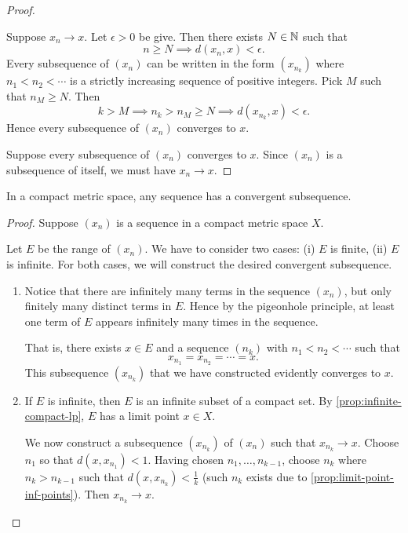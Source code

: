 \begin{proof} \

\fbox{$\implies$} Suppose $x_n\to x$. Let $\epsilon>0$ be give. Then there exists $N\in\mathbb N$ such that
\[n\ge N\implies d(x_n,x)<\epsilon.\]
Every subsequence of $(x_n)$ can be written in the form $(x_{n_k})$ where $n_1<n_2<\cdots$ is a strictly increasing sequence of positive integers. Pick $M$ such that $n_M\ge N$. Then
\[k>M\implies n_k>n_M\ge N\implies d(x_{n_k},x)<\epsilon.\]
Hence every subsequence of $(x_n)$ converges to $x$.

\fbox{$\impliedby$} Suppose every subsequence of $(x_n)$ converges to $x$. Since $(x_n)$ is a subsequence of itself, we must have $x_n\to x$.
\end{proof}

\begin{proposition}
In a compact metric space, any sequence has a convergent subsequence.
\end{proposition}

\begin{proof}
Suppose $(x_n)$ is a sequence in a compact metric space $X$.

Let $E$ be the range of $(x_n)$. We have to consider two cases: (i) $E$ is finite, (ii) $E$ is infinite. For both cases, we will construct the desired convergent subsequence.
\begin{enumerate}[label=(\roman*)]
\item Notice that there are infinitely many terms in the sequence $(x_n)$, but only finitely many distinct terms in $E$. Hence by the pigeonhole principle, at least one term of $E$ appears infinitely many times in the sequence.

That is, there exists $x\in E$ and a sequence $(n_k)$ with $n_1<n_2<\cdots$ such that
\[x_{n_1}=x_{n_2}=\cdots=x.\]
This subsequence $(x_{n_k})$ that we have constructed evidently converges to $x$.

\item If $E$ is infinite, then $E$ is an infinite subset of a compact set. By \cref{prop:infinite-compact-lp}, $E$ has a limit point $x\in X$.

We now construct a subsequence $(x_{n_k})$ of $(x_n)$ such that $x_{n_k}\to x$. Choose $n_1$ so that $d(x,x_{n_1})<1$. Having chosen $n_1,\dots,n_{k-1}$, choose $n_k$ where $n_k>n_{k-1}$ such that $d(x,x_{n_k})<\frac{1}{k}$ (such $n_k$ exists due to \cref{prop:limit-point-inf-points}). Then $x_{n_k}\to x$.
\end{enumerate}
\end{proof}


